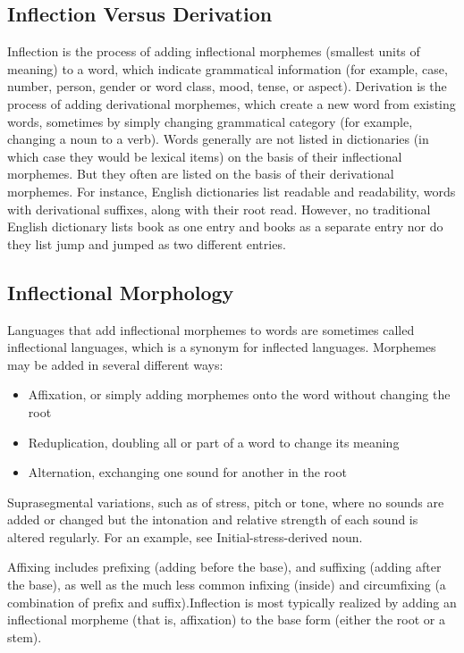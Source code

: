 \subsection{Inflection Versus Derivation}
Inflection is the process of adding inflectional morphemes (smallest units of meaning) to a word, which indicate grammatical information (for example, case, number, person, gender or word class, mood, tense, or aspect). Derivation is the process of adding derivational morphemes, which create a new word from existing words, sometimes by simply changing grammatical category (for example, changing a noun to a verb).  Words generally are not listed in dictionaries (in which case they would be lexical items) on the basis of their inflectional morphemes. But they often are listed on the basis of their derivational morphemes. For instance, English dictionaries list readable and readability, words with derivational suffixes, along with their root read. However, no traditional English dictionary lists book as one entry and books as a separate entry nor do they list jump and jumped as two different entries.

\subsection{Inflectional Morphology}
Languages that add inflectional morphemes to words are sometimes called inflectional languages, which is a synonym for inflected languages. Morphemes may be added in several different ways:
\begin{itemize}
  \item Affixation, or simply adding morphemes onto the word without changing the root
\item Reduplication, doubling all or part of a word to change its meaning
\item Alternation, exchanging one sound for another in the root
\end{itemize}
Suprasegmental variations, such as of stress, pitch or tone, where no sounds are added or changed but the intonation and relative strength of each sound is altered regularly. For an example, see Initial-stress-derived noun.

Affixing includes prefixing (adding before the base), and suffixing (adding after the base), as well as the much less common infixing (inside) and circumfixing (a combination of prefix and suffix).Inflection is most typically realized by adding an inflectional morpheme (that is, affixation) to the base form (either the root or a stem).

